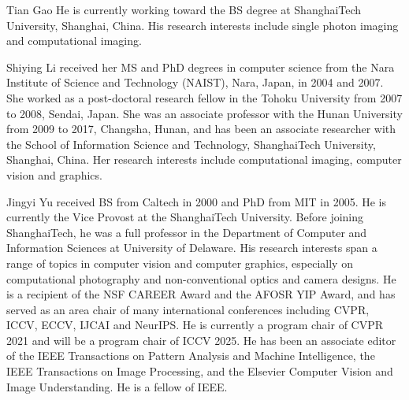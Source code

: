 \documentclass[10pt,journal,compsoc]{IEEEtran}
\begin{document}
\vspace{-8mm}
\begin{IEEEbiography}{Tian Gao}
He is currently working toward the BS
degree at ShanghaiTech University, Shanghai,
China. His research interests include single photon imaging and computational imaging.
\end{IEEEbiography}
\vspace{-8mm}
\begin{IEEEbiography}{Shiying Li} received her MS and PhD degrees in computer science from the Nara Institute of Science and Technology (NAIST), Nara, Japan, in 2004 and 2007. She worked as a post-doctoral research fellow in the Tohoku University from 2007 to 2008, Sendai, Japan. She was an associate professor with the Hunan University from 2009 to 2017, Changsha, Hunan, and has been an associate researcher with the School of Information Science and Technology, ShanghaiTech University, Shanghai, China. Her research interests include computational imaging, computer vision and graphics.  
\end{IEEEbiography}
\vspace{-8mm}
\begin{IEEEbiography}{Jingyi Yu} received BS from Caltech in 2000 and PhD from MIT in 2005. He is currently the Vice Provost at the ShanghaiTech University. Before joining ShanghaiTech, he was a full professor in the Department of Computer and Information Sciences at University of Delaware. His research interests span a range of topics in computer vision and computer graphics, especially on computational photography and non-conventional optics and camera designs. He is a recipient of the NSF CAREER Award and the AFOSR YIP Award, and has served as an area chair of many international conferences including CVPR, ICCV, ECCV, IJCAI and NeurIPS. He is currently a program chair of CVPR 2021 and will be a program chair of ICCV 2025. He has been an associate editor of the IEEE Transactions on Pattern Analysis and Machine Intelligence, the IEEE Transactions on Image Processing, and the Elsevier Computer Vision and Image Understanding. He is a fellow of IEEE. 
\end{IEEEbiography}
\end{document}
